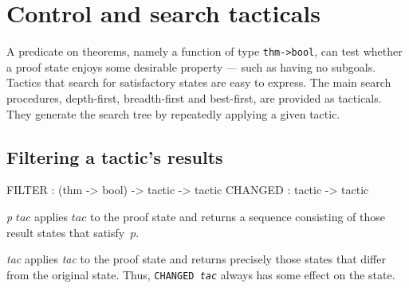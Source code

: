 \section{Control and search tacticals}

A predicate on theorems, namely a function of type \hbox{\tt thm->bool},
can test whether a proof state enjoys some desirable property --- such as
having no subgoals.  Tactics that search for satisfactory states are easy
to express.  The main search procedures, depth-first, breadth-first and
best-first, are provided as tacticals.  They generate the search tree by
repeatedly applying a given tactic.


\subsection{Filtering a tactic's results}
\begin{ttbox} 
FILTER  : (thm -> bool) -> tactic -> tactic
CHANGED : tactic -> tactic
\end{ttbox}
\begin{ttdescription}
\item[\ttindexbold{FILTER} {\it p} $tac$] 
applies $tac$ to the proof state and returns a sequence consisting of those
result states that satisfy~$p$.

\item[\ttindexbold{CHANGED} {\it tac}] 
applies {\it tac\/} to the proof state and returns precisely those states
that differ from the original state.  Thus, \hbox{\tt CHANGED {\it tac}}
always has some effect on the state.
\end{ttdescription}


